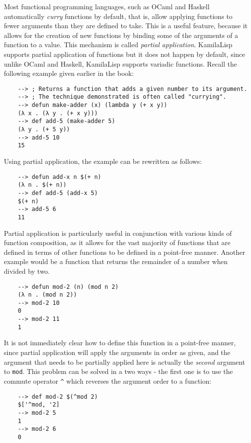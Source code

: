 Most functional programming languages, such as OCaml and Haskell automatically \textit{curry} functions by default, that is, allow applying functions to fewer arguments than they are defined to take. This is a useful feature, because it allows for the creation of new functions by binding some of the arguments of a function to a value. This mechanism is called \textit{partial application}. KamilaLisp supports partial application of functions but it does not happen by default, since unlike OCaml and Haskell, KamilaLisp supports variadic functions. Recall the following example given earlier in the book:

\begin{Verbatim}
    --> ; Returns a function that adds a given number to its argument.
    --> ; The technique demonstrated is often called "currying".
    --> defun make-adder (x) (lambda y (+ x y))
    (λ x . (λ y . (+ x y)))
    --> def add-5 (make-adder 5)
    (λ y . (+ 5 y))
    --> add-5 10
    15
\end{Verbatim}

Using partial application, the example can be rewritten as follows:

\begin{Verbatim}
    --> defun add-x n $(+ n)
    (λ n . $(+ n))
    --> def add-5 (add-x 5)
    $(+ n)
    --> add-5 6
    11
\end{Verbatim}

Partial application is particularly useful in conjunction with various kinds of function composition, as it allows for the vast majority of functions that are defined in terms of other functions to be defined in a point-free manner. Another example would be a function that returns the remainder of a number when divided by two.

\begin{Verbatim}
    --> defun mod-2 (n) (mod n 2)
    (λ n . (mod n 2))
    --> mod-2 10
    0
    --> mod-2 11
    1
\end{Verbatim}

It is not immediately clear how to define this function in a point-free manner, since partial application will apply the arguments in order as given, and the argument that needs to be partially applied here is actually the \textit{second} argument to \verb|mod|. This problem can be solved in a two ways - the first one is to use the commute operator \verb|^| which reverses the argument order to a function:

\begin{Verbatim}
    --> def mod-2 $(^mod 2)
    $['^mod, '2]
    --> mod-2 5
    1
    --> mod-2 6
    0
\end{Verbatim}

